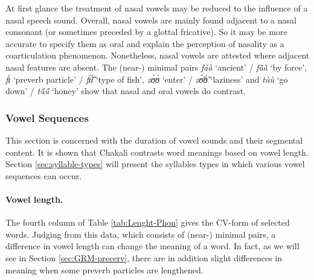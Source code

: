 At first glance the treatment of nasal vowels may be  reduced to the influence 
 of a nasal speech sound. Overall, nasal vowels are mainly found
adjacent to a nasal consonant (or sometimes preceded by
a glottal fricative).  So it may be more accurate to specify them as oral and
explain the perception of nasality as a coarticulation phenomenon. 
Nonetheless,
nasal vowels are attested where adjacent nasal features are absent. The
(near-) minimal pairs  {\it fáà}
`ancient' / {\it fã̀ã̀} `by force',  {\it fɪ̀} `preverb particle' / {\it 
fɪ̃́ɪ̃́}
`type of fish', {\it zʊ̀ʊ̀} `enter' /  {\it zʊ̃̀ʊ̃̀} `laziness'  and  {\it 
tùù}
`go down' /  {\it tṹṹ} `honey'  show that nasal and oral vowels do 
contrast. 




\subsubsection{Vowel Sequences}
\label{sec:vowels-seq}
This section is concerned with the duration of vowel sounds and their segmental
content.  It is shown that Chakali contrasts word meanings based on vowel
length. Section \ref{sec:syllable-types} will present the syllables types in 
which various vowel sequences can occur.

\paragraph{Vowel length.}
\label{sec:short-long-vowels}

The fourth column of Table \ref{tab:Lenght-Phon} gives the CV-form of  selected 
 words.
Judging from this data, which consists of (near-) minimal pairs,  a
difference in vowel length can change the meaning of a word.  In fact, as we
will see in Section \ref{sec:GRM-precerv}, there are in addition  slight
differences in
meaning when some preverb particles are lengthened. 

